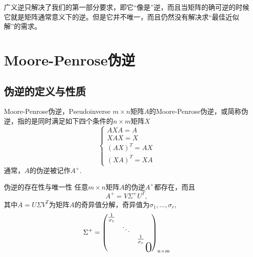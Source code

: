 
\begin{frame}

{
\large
广义逆只解决了我们的第一部分要求，即它``像是''逆，而且当矩阵的确可逆的时候它就是矩阵通常意义下的逆。但是它并不唯一，而且仍然没有解决求``最佳近似解''的需求。
}

\end{frame}


\section{Moore-Penrose伪逆}


\subsection{伪逆的定义与性质}


\begin{frame}

\begin{block}{Moore-Penrose伪逆，Pseudoinverse}
$m\times n$矩阵$A$的Moore-Penrose伪逆，或简称伪逆，指的是同时满足如下四个条件的$n\times m$矩阵$X$
\[
\begin{cases}
AXA = A \\
XAX = X \\
(AX)^T = AX \\
(XA)^T = XA
\end{cases}
\]
通常，$A$的伪逆被记作$A^+$.
\end{block}

\end{frame}


\begin{frame}

\begin{block}{伪逆的存在性与唯一性}
任意$m\times n$矩阵$A$的伪逆$A^+$都存在，而且
$$A^+ = V\Sigma^+U^T,$$
其中$A = U\Sigma V^T$为矩阵$A$的奇异值分解，奇异值为$\sigma_1, \ldots, \sigma_r$,
$$\Sigma^+ = \begin{pmatrix}
\frac{1}{\sigma_1} & & & \\ & \ddots & & \\ & & \frac{1}{\sigma_r} & \\ & & & \bigzero \end{pmatrix}_{n\times m}$$
\end{block}

\end{frame}

